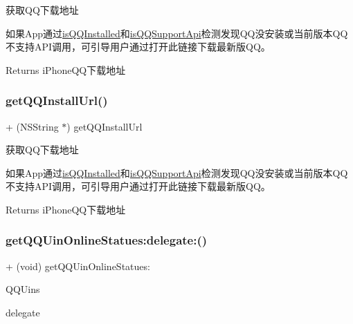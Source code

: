 获取\+Q\+Q下载地址

如果\+App通过{\ttfamily \mbox{\hyperlink{interface_q_q_api_interface_a3cce7811084fbe0fac86a61068a5bb8f}{is\+Q\+Q\+Installed}}}和{\ttfamily \mbox{\hyperlink{interface_q_q_api_interface_a3669fca9c3a1df5991416dc3a5a719c4}{is\+Q\+Q\+Support\+Api}}}检测发现\+Q\+Q没安装或当前版本\+Q\+Q不支持\+A\+P\+I调用，可引导用户通过打开此链接下载最新版\+Q\+Q。 \begin{DoxyReturn}{Returns}
i\+Phone\+Q\+Q下载地址 
\end{DoxyReturn}
\mbox{\label{interface_q_q_api_interface_a6cbc694efeaefe36335c9ac89e575ff4}} 
\subsubsection{\texorpdfstring{get\+Q\+Q\+Install\+Url()}{getQQInstallUrl()}\hspace{0.1cm}{\footnotesize\ttfamily [2/2]}}
{\footnotesize\ttfamily + (N\+S\+String $\ast$) get\+Q\+Q\+Install\+Url \begin{DoxyParamCaption}{ }\end{DoxyParamCaption}}

获取\+Q\+Q下载地址

如果\+App通过{\ttfamily \mbox{\hyperlink{interface_q_q_api_interface_a3cce7811084fbe0fac86a61068a5bb8f}{is\+Q\+Q\+Installed}}}和{\ttfamily \mbox{\hyperlink{interface_q_q_api_interface_a3669fca9c3a1df5991416dc3a5a719c4}{is\+Q\+Q\+Support\+Api}}}检测发现\+Q\+Q没安装或当前版本\+Q\+Q不支持\+A\+P\+I调用，可引导用户通过打开此链接下载最新版\+Q\+Q。 \begin{DoxyReturn}{Returns}
i\+Phone\+Q\+Q下载地址 
\end{DoxyReturn}
\mbox{\label{interface_q_q_api_interface_ae77e4e9dd1328f58048144afe625cfbf}} 
\subsubsection{\texorpdfstring{get\+Q\+Q\+Uin\+Online\+Statues\+:delegate\+:()}{getQQUinOnlineStatues:delegate:()}\hspace{0.1cm}{\footnotesize\ttfamily [1/2]}}
{\footnotesize\ttfamily + (void) get\+Q\+Q\+Uin\+Online\+Statues\+: \begin{DoxyParamCaption}\item[{(N\+S\+Array $\ast$)}]{Q\+Q\+Uins }\item[{delegate:(id$<$ Q\+Q\+Api\+Interface\+Delegate $>$)}]{delegate }\end{DoxyParamCaption}}

